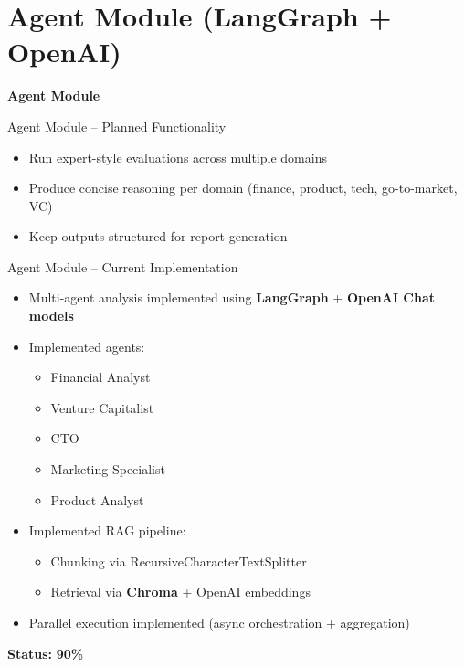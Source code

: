 \documentclass{beamer}
\begin{document}
\section{Agent Module (LangGraph + OpenAI)}

\begin{frame}
\centering
\Huge \textbf{Agent Module}
\end{frame}

\begin{frame}{Agent Module – Planned Functionality}
\begin{itemize}
    \item Run expert-style evaluations across multiple domains
    \item Produce concise reasoning per domain (finance, product, tech, go-to-market, VC)
    \item Keep outputs structured for report generation
\end{itemize}
\end{frame}

\begin{frame}{Agent Module – Current Implementation}
\begin{itemize}
    \item Multi-agent analysis implemented using \textbf{LangGraph} + \textbf{OpenAI Chat models}
    \item Implemented agents:
    \begin{itemize}
        \item Financial Analyst
        \item Venture Capitalist
        \item CTO
        \item Marketing Specialist
        \item Product Analyst
    \end{itemize}
    \item Implemented RAG pipeline:
    \begin{itemize}
        \item Chunking via RecursiveCharacterTextSplitter
        \item Retrieval via \textbf{Chroma} + OpenAI embeddings
    \end{itemize}
    \item Parallel execution implemented (async orchestration + aggregation)
\end{itemize}

\vspace{0.4em}
\textbf{Status:} \textbf{90\%}
\end{frame}
\end{document}
